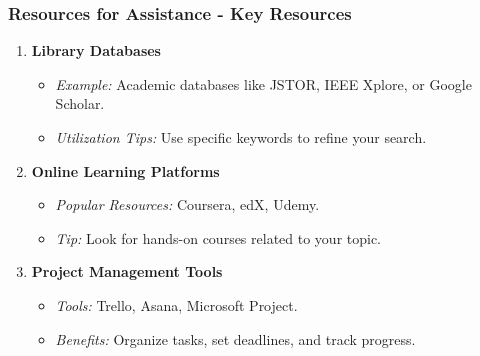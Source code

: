 \documentclass[aspectratio=169]{beamer}
\begin{document}
\begin{frame}[fragile]
    \frametitle{Resources for Assistance - Key Resources}
    \begin{enumerate}
        \item \textbf{Library Databases}
            \begin{itemize}
                \item \textit{Example:} Academic databases like JSTOR, IEEE Xplore, or Google Scholar.
                \item \textit{Utilization Tips:} Use specific keywords to refine your search.
            \end{itemize}
        \item \textbf{Online Learning Platforms}
            \begin{itemize}
                \item \textit{Popular Resources:} Coursera, edX, Udemy.
                \item \textit{Tip:} Look for hands-on courses related to your topic.
            \end{itemize}
        \item \textbf{Project Management Tools}
            \begin{itemize}
                \item \textit{Tools:} Trello, Asana, Microsoft Project.
                \item \textit{Benefits:} Organize tasks, set deadlines, and track progress.
            \end{itemize}
    \end{enumerate}
\end{frame}
\end{document}
